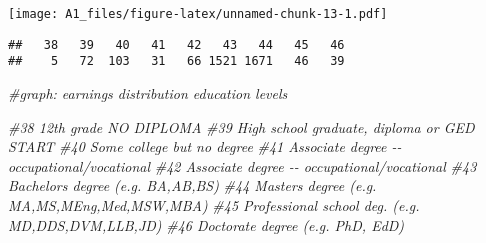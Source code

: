 \documentclass[
]{article}
\newenvironment{Shaded}{\begin{snugshade}}{\end{snugshade}}
\newcommand{\CommentTok}[1]{\textcolor[rgb]{0.56,0.35,0.01}{\textit{#1}}}
\newcommand{\FunctionTok}[1]{\textcolor[rgb]{0.00,0.00,0.00}{#1}}
\newcommand{\NormalTok}[1]{#1}
\newcommand{\SpecialCharTok}[1]{\textcolor[rgb]{0.00,0.00,0.00}{#1}}
\begin{document}
\texttt{[image: A1\_files/figure-latex/unnamed-chunk-13-1.pdf]}

\begin{Shaded}
\end{Shaded}

\begin{verbatim}
##   38   39   40   41   42   43   44   45   46 
##    5   72  103   31   66 1521 1671   46   39
\end{verbatim}

\begin{Shaded}
\begin{Highlighting}[]
\CommentTok{\#graph: earnings distribution education levels }


\CommentTok{\#38 12th grade NO DIPLOMA}
\CommentTok{\#39 High school graduate, diploma or GED START }
\CommentTok{\#40 Some college but no degree }
\CommentTok{\#41 Associate degree {-}{-} occupational/vocational }
\CommentTok{\#42 Associate degree {-}{-} occupational/vocational }
\CommentTok{\#43 Bachelor\textquotesingle{}s degree (e.g. BA,AB,BS) }
\CommentTok{\#44 Master\textquotesingle{}s degree (e.g. MA,MS,MEng,Med,MSW,MBA) }
\CommentTok{\#45 Professional school deg. (e.g. MD,DDS,DVM,LLB,JD)}
\CommentTok{\#46 Doctorate degree (e.g. PhD, EdD) }


\end{Highlighting}
\end{Shaded}
\end{document}

